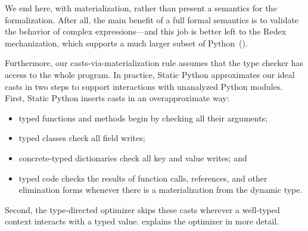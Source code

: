 \documentclass[english,cleveref,crc]{programming}
\newcommand{\SP}{Static Python}
\begin{document}
We end here, with materialization, rather than present a semantics
for the formalization.
After all, the main benefit of a full formal semantics is to validate
the behavior of complex expressions---and this job is
better left to the Redex mechanization, which supports a much
larger subset of Python~().

Furthermore, our casts-via-materialization rule assumes that the
type checker has access to the whole program.
In practice, \SP{} approximates our ideal casts in two steps
to support interactions with unanalyzed Python modules.
First, \SP{} inserts casts in an overapproximate way:
\begin{itemize}
  \item
    typed functions and methods begin by checking all their arguments;
  \item
    typed classes check all field writes;
  \item
    concrete-typed dictionaries check all key and value writes; and
  \item
    typed code checks the results of function calls, references, and other elimination forms
    whenever there is a materialization from the dynamic type.
\end{itemize}
Second, the type-directed optimizer skips these casts wherever
a well-typed context interacts with a typed value.
 explains the optimizer in more detail.
\end{document}
